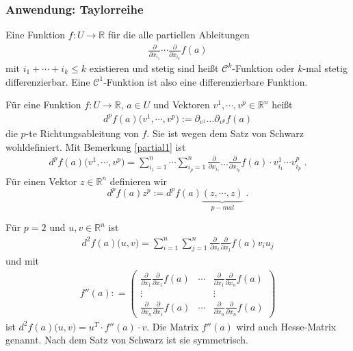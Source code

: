 \subsubsection*{Anwendung: Taylorreihe} 


\begin{Definition}
Eine  Funktion  $f: U \to \mathbb{R}$ für die alle partiellen Ableitungen 
\begin{align*}
 \frac{\partial}{\partial x_{i_1}} \cdots   \frac{\partial}{\partial x_{i_k}} f(a)
\end{align*}
mit $i_1 + \cdots + i_k \leq k$ existieren und stetig sind heißt $\mathcal{C}^k$-Funktion oder $k$-mal stetig differenzierbar. Eine 
$\mathcal{C}^1$-Funktion ist also eine differenzierbare Funktion.
\end{Definition}

\begin{Definition}
Für  eine Funktion  $f: U \to \mathbb{R}$, $a \in U$ und Vektoren $v^1, \cdots , v^p \in \mathbb{R}^n$ heißt 
\begin{align*}
d^pf(a) \bigl(v^1, \cdots , v^p  ) := \partial_{v^1} \hdots \partial_{v^p} f(a)
\end{align*}
die $p$-te Richtungsableitung von $f$. Sie ist wegen dem Satz von Schwarz wohldefiniert.
Mit Bemerkung \ref{partial1} ist
\begin{align*}
d^pf(a) \bigl(v^1, \cdots , v^p  ) = \sum_{i_1 = 1}^n \cdots \sum_{i_p = 1}^n  \frac{\partial}{\partial x_{i_1}} \hdots \frac{\partial}{\partial x_{i_p}} f(a) \cdot v^1_{i_1} \cdots v^p_{i_p} \; .
\end{align*}
Für einen Vektor $z \in \mathbb{R}^n$ definieren wir $$d^pf(a) z^p := d^pf(a) \underbrace{(z, \cdots , z)}_{p-mal} \;.$$

\end{Definition}



\begin{Bemerkung}
Für $p = 2$ und $u,v \in \mathbb{R}^n$ ist
\begin{align*}
d^2f(a) \bigl(u , v ) = \sum_{i = 1}^n \sum_{j = 1}^n \frac{\partial}{\partial x_{i}}  \frac{\partial}{\partial x_{j}} f(a) v_{i}  u_{j} 
\end{align*}
und mit 
\begin{align*}
f''(a) : = \begin{pmatrix}  \frac{\partial}{\partial x_{1}} \frac{\partial}{\partial x_{1}} f(a)   &  \cdots &  \frac{\partial}{\partial x_{1}} \frac{\partial}{\partial x_{n}} f(a) \\
\vdots & & \vdots  \\
 \frac{\partial}{\partial x_{n}} \frac{\partial}{\partial x_{1}} f(a)   &  \cdots &  \frac{\partial}{\partial x_{n}} \frac{\partial}{\partial x_{n}} f(a)
\end{pmatrix} 
\end{align*}
ist $d^2f(a) \bigl(u , v ) = u^T  \cdot f''(a) \cdot v$. Die Matrix $f''(a)$ wird auch Hesse-Matrix genannt. Nach dem Satz von Schwarz ist sie symmetrisch.
\end{Bemerkung}


